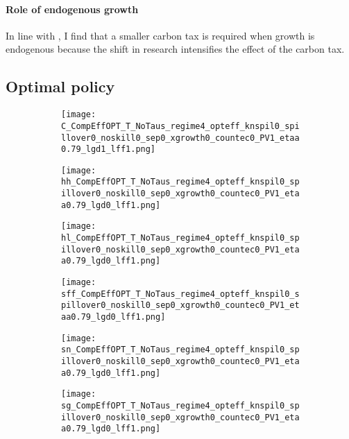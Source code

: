 \paragraph{Role of endogenous growth}
In line with \cite{Fried2018ClimateAnalysis}, I find that a smaller carbon tax is required when growth is endogenous because the shift in research intensifies the effect of the carbon tax.  


\newpage
\subsection{Optimal policy}\label{app:quant_res_opt}


\begin{figure}[h!!]
	\centering
	\caption{Laissez-faire, optimal, and efficient allocation in levels }\label{fig:LF}	
	\begin{subfigure}[]{0.32\textwidth}
		\texttt{[image: C\_CompEffOPT\_T\_NoTaus\_regime4\_opteff\_knspil0\_spillover0\_noskill0\_sep0\_xgrowth0\_countec0\_PV1\_etaa0.79\_lgd1\_lff1.png]}
	\end{subfigure}	
	\begin{subfigure}[]{0.32\textwidth}
		\texttt{[image: hh\_CompEffOPT\_T\_NoTaus\_regime4\_opteff\_knspil0\_spillover0\_noskill0\_sep0\_xgrowth0\_countec0\_PV1\_etaa0.79\_lgd0\_lff1.png]}
	\end{subfigure}	
	\begin{subfigure}[]{0.32\textwidth}
		\texttt{[image: hl\_CompEffOPT\_T\_NoTaus\_regime4\_opteff\_knspil0\_spillover0\_noskill0\_sep0\_xgrowth0\_countec0\_PV1\_etaa0.79\_lgd0\_lff1.png]}
	\end{subfigure}		\begin{subfigure}[]{0.32\textwidth}
		\texttt{[image: sff\_CompEffOPT\_T\_NoTaus\_regime4\_opteff\_knspil0\_spillover0\_noskill0\_sep0\_xgrowth0\_countec0\_PV1\_etaa0.79\_lgd0\_lff1.png]}
	\end{subfigure}	
	\begin{subfigure}[]{0.32\textwidth}
		\texttt{[image: sn\_CompEffOPT\_T\_NoTaus\_regime4\_opteff\_knspil0\_spillover0\_noskill0\_sep0\_xgrowth0\_countec0\_PV1\_etaa0.79\_lgd0\_lff1.png]}
	\end{subfigure}	
	\begin{subfigure}[]{0.32\textwidth}
		\texttt{[image: sg\_CompEffOPT\_T\_NoTaus\_regime4\_opteff\_knspil0\_spillover0\_noskill0\_sep0\_xgrowth0\_countec0\_PV1\_etaa0.79\_lgd0\_lff1.png]}
	\end{subfigure}
\end{figure}


